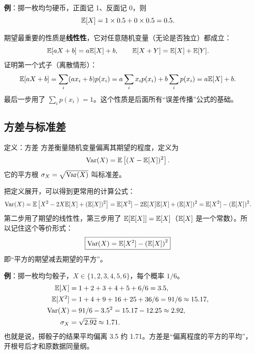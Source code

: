\textbf{例}：掷一枚均匀硬币，正面记 1、反面记 0，则
\begin{equation}
\mathbb{E}[X]=1\times 0.5+0\times 0.5=0.5.
\end{equation}

期望最重要的性质是\textbf{线性性}，它对任意随机变量（无论是否独立）都成立：
\begin{equation}
\mathbb{E}[aX+b]=a\mathbb{E}[X]+b,\qquad \mathbb{E}[X+Y]=\mathbb{E}[X]+\mathbb{E}[Y].
\label{eq:02-lin}
\end{equation}
证明第一个式子（离散情形）：
\begin{equation}
\mathbb{E}[aX+b]=\sum_i (ax_i+b)p(x_i)=a\sum_i x_ip(x_i)+b\sum_i p(x_i)=a\mathbb{E}[X]+b.
\end{equation}
最后一步用了 $\sum_i p(x_i)=1$。这个性质是后面所有“误差传播”公式的基础。

\subsection{方差与标准差}

\begin{keybox}{定义：方差}
方差衡量随机变量偏离其期望的程度，定义为
\begin{equation}
\operatorname{Var}(X)=\mathbb{E}\left[(X-\mathbb{E}[X])^{2}\right].
\label{eq:02-vardef}
\end{equation}
它的平方根 $\sigma_X=\sqrt{\operatorname{Var}(X)}$ 叫标准差。
\end{keybox}

把定义展开，可以得到更常用的计算公式：
\begin{equation}
\operatorname{Var}(X)=\mathbb{E}\left[X^{2}-2X\mathbb{E}[X]+(\mathbb{E}[X])^{2}\right]
=\mathbb{E}[X^{2}]-2\mathbb{E}[X]\mathbb{E}[X]+(\mathbb{E}[X])^{2}
=\mathbb{E}[X^{2}]-(\mathbb{E}[X])^{2}.
\label{eq:02-var-expand}
\end{equation}
第二步用了期望的线性性，第三步用了 $\mathbb{E}[\mathbb{E}[X]]=\mathbb{E}[X]$（$\mathbb{E}[X]$ 是一个常数）。所以记住这个等价形式：
\begin{equation}
\boxed{\operatorname{Var}(X)=\mathbb{E}[X^{2}]-\left(\mathbb{E}[X]\right)^{2}}
\end{equation}
即“平方的期望减去期望的平方”。

\textbf{例}：掷一枚均匀骰子，$X\in\{1,2,3,4,5,6\}$，每个概率 $1/6$。
\begin{align}
\mathbb{E}[X]&=1+2+3+4+5+6/6=3.5,\\
\mathbb{E}[X^{2}]&=1+4+9+16+25+36/6=91/6\approx 15.17,\\
\operatorname{Var}(X)&=91/6-3.5^{2}=15.17-12.25\approx 2.92,\\
\sigma_X&=\sqrt{2.92}\approx 1.71.
\end{align}
也就是说，掷骰子的结果平均偏离 3.5 约 1.71。方差是“偏离程度的平方的平均”，开根号后才和原数据同量纲。

